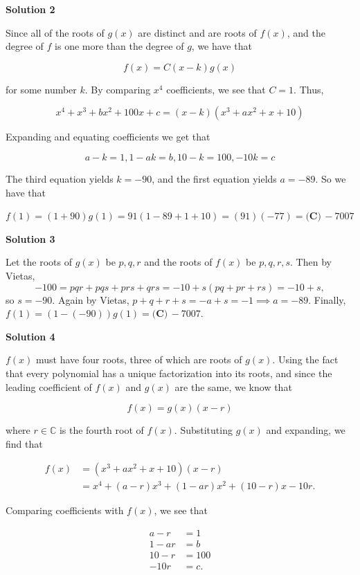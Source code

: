 \begin{enumerate}
\textbf{Solution 2}

Since all of the roots of $g(x)$ are distinct and are roots of $f(x)$, and the degree of $f$ is one more than the degree of $g$, we have that 

 
 \[f(x) = C(x-k)g(x)\]

 for some number $k$. By comparing $x^4$ coefficients, we see that $C=1$. Thus,

 
 \[x^4+x^3+bx^2+100x+c=(x-k)(x^3+ax^2+x+10)\]

 Expanding and equating coefficients we get that

 
 \[a-k=1,1-ak=b,10-k=100,-10k=c\]

 The third equation yields $k=-90$, and the first equation yields $a=-89$. So we have that

 $f(1)=(1+90)g(1)=91(1-89+1+10)=(91)(-77)=\boxed{\textbf{(C)}\,-7007}$




\textbf{Solution 3}

Let the roots of $g(x)$ be $p,q,r$ and the roots of $f(x)$ be $p,q,r,s$. Then by Vietas, 
 \[-100=pqr+pqs+prs+qrs = -10+ s(pq+pr+rs) = -10 + s,\]so $s = -90$. Again by Vietas, $p+q+r+s = -a + s = -1 \implies a = -89$. Finally, $f(1) = (1-(-90))g(1) = \textbf{(C)}\,-7007$.

 



\textbf{Solution 4}

$f(x)$ must have four roots, three of which are roots of $g(x)$. Using the fact that every polynomial has a unique factorization into its roots, and since the leading coefficient of $f(x)$ and $g(x)$ are the same, we know that

 
 \[f(x)=g(x)(x-r)\]

 where $r\in\mathbb{C}$ is the fourth root of $f(x)$. Substituting $g(x)$ and expanding, we find that

 
 \begin{align*}f(x)&=(x^3+ax^2+x+10)(x-r)\\ &=x^4+(a-r)x^3+(1-ar)x^2+(10-r)x-10r.\end{align*}


 Comparing coefficients with $f(x)$, we see that

 
 \begin{align*} a-r&=1\\ 1-ar&=b\\ 10-r&=100\\ -10r&=c.\\ \end{align*}



\end{enumerate}

